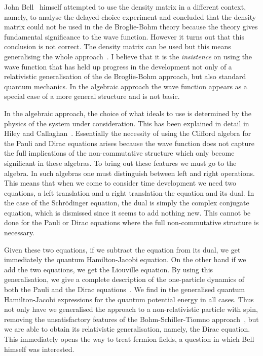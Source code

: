 \documentclass[11pt]{article}
\begin{document}
John Bell~\cite{js80} himself attempted to use the density matrix in a different context, namely, to analyse  
the delayed-choice experiment and concluded that the density matrix could not be used in the de Broglie-Bohm theory because the theory gives fundamental significance to the wave function.  However it turns out that this conclusion is not correct.  The density matrix can be used but this means generalising the whole approach~\cite{bh13}.
I believe that it is the {\em insistence} on using the wave function that has held up progress in the development not only of a relativistic generalisation of the de Broglie-Bohm approach, but also standard quantum mechanics.  In the algebraic approach the wave function appears as a special case of a more general structure and is not basic.

In the algebraic approach, the choice of what ideals to use  is determined by the physics of the system under consideration.  This has been explained in detail in Hiley and Callaghan~\cite{bhbc11}.  Essentially the necessity of using the Clifford algebra for  the Pauli and Dirac equations arises because the wave function does not capture the full implications of the non-commutative structure  which only become significant in these algebras. To bring out these features we must go to the algebra.  In such algebras one must distinguish between left and right operations. This means that when we come to consider time development we need two equations, a left translation and a right translation-the equation and its dual.  In the case of the Schr\"{o}dinger equation, the dual is simply the complex conjugate equation, which is dismissed since it seems to  add nothing new.  This cannot be done for the Pauli or Dirac equations where the full non-commutative structure is necessary.

Given these two equations, if we subtract the equation from its dual, we  get immediately the quantum Hamilton-Jacobi equation.  On the other hand if we add the two equations, we get the Liouville equation.  By using this generalisation, we give a complete description of the one-particle dynamics of both the Pauli and the Dirac equations~\cite{bh13}.  We find in the generalised quantum Hamilton-Jacobi expressions for the quantum potential energy in all cases.
 Thus not only have we generalised the approach to a non-relativistic particle with spin, removing the unsatisfactory features of the Bohm-Schiller-Tiomno approach~\cite{bst55}, but we are able to obtain its relativistic generalisation, namely, the Dirac equation.   This immediately opens the way to treat fermion fields, a question in which Bell himself was interested.  
\end{document}
